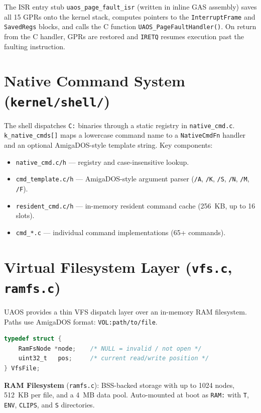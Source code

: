 \documentclass[11pt,a4paper]{report}
\begin{document}
The ISR entry stub \texttt{uaos\_page\_fault\_isr} (written in inline GAS
assembly) saves all 15 GPRs onto the kernel stack, computes pointers to the
\texttt{InterruptFrame} and \texttt{SavedRegs} blocks, and calls the C
function \texttt{UAOS\_PageFaultHandler()}.  On return from the C handler,
GPRs are restored and \texttt{IRETQ} resumes execution past the faulting
instruction.

\section{Native Command System (\texttt{kernel/shell/})}

The shell dispatches \texttt{C:} binaries through a static registry in
\texttt{native\_cmd.c}.  \texttt{k\_native\_cmds[]} maps a lowercase command
name to a \texttt{NativeCmdFn} handler and an optional AmigaDOS-style template
string.  Key components:

\begin{itemize}
    \item \texttt{native\_cmd.c/h} --- registry and case-insensitive lookup.
    \item \texttt{cmd\_template.c/h} --- AmigaDOS-style argument parser
          (\texttt{/A}, \texttt{/K}, \texttt{/S}, \texttt{/N}, \texttt{/M}, \texttt{/F}).
    \item \texttt{resident\_cmd.c/h} --- in-memory resident command cache
          (256~KB, up to 16 slots).
    \item \texttt{cmd\_*.c} --- individual command implementations (65+ commands).
\end{itemize}

\section{Virtual Filesystem Layer (\texttt{vfs.c}, \texttt{ramfs.c})}

UAOS provides a thin VFS dispatch layer over an in-memory RAM filesystem.
Paths use AmigaDOS format: \texttt{VOL:path/to/file}.

\begin{lstlisting}[language=C, caption={VFS file handle}]
typedef struct {
    RamFsNode *node;    /* NULL = invalid / not open */
    uint32_t   pos;     /* current read/write position */
} VfsFile;
\end{lstlisting}

\textbf{RAM Filesystem} (\texttt{ramfs.c}): BSS-backed storage with up to 1024
nodes, 512~KB per file, and a 4~MB data pool.  Auto-mounted at boot as
\texttt{RAM:} with \texttt{T}, \texttt{ENV}, \texttt{CLIPS}, and \texttt{S}
directories.
\end{document}
